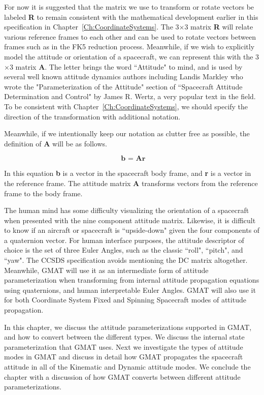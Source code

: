For now it is suggested that the matrix we use to transform or rotate vectors be
labeled \textbf{R} to remain consistent with the mathematical development
earlier in this specification in Chapter~\ref{Ch:CoordinateSystems}.  The
3$\times$3 matrix \textbf{R} will relate various reference frames to each other
and can be used to rotate vectors between frames such as in the FK5 reduction
process.  Meanwhile, if we wish to explicitly model the attitude or orientation
of a spacecraft, we can represent this with the 3$\times$3 matrix \textbf{A}.
The letter brings the word ``Attitude" to mind, and is used by several well known
attitude dynamics authors including Landis Markley who wrote the
"Parameterization of the Attitude" section of ``Spacecraft Attitude
Determination and Control" by James R. Wertz, a very popular text in the field.
To be consistent with Chapter~\ref{Ch:CoordinateSystems}, we should specify the
direction of the transformation with additional notation.

Meanwhile, if we intentionally keep our notation as clutter free as possible,
the definition of \textbf{A} will be as follows.

\begin{equation}
    \textbf{ b = Ar}
    \label{Eq:FundamentalAMat}
\end{equation}

In this equation \textbf{b} is a vector in the spacecraft body frame, and
\textbf{r} is a vector in the reference frame.  The attitude matrix \textbf{A}
transforms vectors from the reference frame to the body frame.

The human mind has some difficulty visualizing the orientation of a spacecraft
when presented with the nine component attitude matrix.  Likewise, it is
difficult to know if an aircraft or spacecraft is ``upside-down" given the four
components of a quaternion vector.  For human interface purposes, the attitude
descriptor of choice is the set of three Euler Angles, such as the classic
``roll", ``pitch", and ``yaw".  The CCSDS specification avoids mentioning the DC
matrix altogether.  Meanwhile, GMAT will use it as an intermediate form of
attitude parameterization when transforming from internal attitude propagation
equations using quaternions, and human interpretable Euler Angles.  GMAT will
also use it for both Coordinate System Fixed and Spinning Spacecraft modes of
attitude propagation.

In this chapter, we discuss the attitude parameterizations supported in GMAT,
and how to convert between the different types.  We discuss the internal state
parameterization that GMAT uses.  Next we investigate the types of attitude
modes in GMAT and discuss in detail how GMAT propagates the spacecraft attitude
in all of the Kinematic and Dynamic attitude modes.  We conclude the chapter
with a discussion of how GMAT converts between different attitude
parameterizations.

